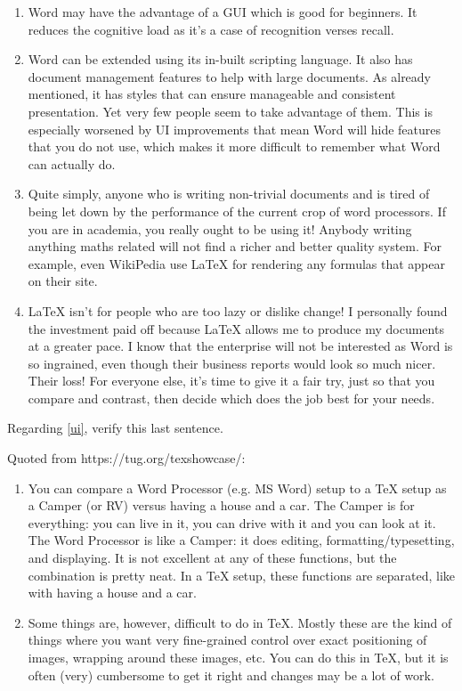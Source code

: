 \documentclass[12pt]{article}
\begin{document}
\begin{enumerate}
  \item Word may have the advantage of a GUI which is good for beginners. It reduces the cognitive load as it's a case of recognition verses recall.
  \item Word can be extended using its in-built scripting language. It also has document management features to help with large documents. As already mentioned, it has styles that can ensure manageable and consistent presentation. Yet very few people seem to take advantage of them. This is especially worsened by UI improvements that mean Word will hide features that you do not use, which makes it more difficult to remember what Word can actually do. \label{ui}
  \item Quite simply, anyone who is writing non-trivial documents and is tired of being let down by the performance of the current crop of word processors. If you are in academia, you really ought to be using it! Anybody writing anything maths related will not find a richer and better quality system. For example, even WikiPedia use LaTeX for rendering any formulas that appear on their site.
  \item LaTeX isn't for people who are too lazy or dislike change! I personally found the investment paid off because LaTeX allows me to produce my documents at a greater pace. I know that the enterprise will not be interested as Word is so ingrained, even though their business reports would look so much nicer. Their loss! For everyone else, it's time to give it a fair try, just so that you compare and contrast, then decide which does the job best for your needs.
\end{enumerate}

Regarding \ref{ui}, verify this last sentence.


Quoted from https://tug.org/texshowcase/:
\begin{enumerate}
  \item You can compare a Word Processor (e.g. MS Word) setup to a TeX setup as a Camper (or RV) versus having a house and a car. The Camper is for everything: you can live in it, you can drive with it and you can look at it. The Word Processor is like a Camper: it does editing, formatting/typesetting, and displaying. It is not excellent at any of these functions, but the combination is pretty neat. In a TeX setup, these functions are separated, like with having a house and a car.
  \item Some things are, however, difficult to do in TeX. Mostly these are the kind of things where you want very fine-grained control over exact positioning of images, wrapping around these images, etc. You can do this in TeX, but it is often (very) cumbersome to get it right and changes may be a lot of work.\\
\end{enumerate}
\end{document}
